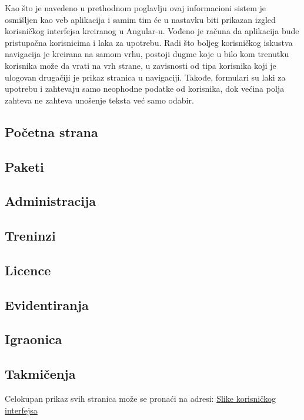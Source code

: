 \documentclass[../main.tex]{subfiles}
\begin{document}
Kao što je navedeno u prethodnom poglavlju ovaj informacioni sistem je osmišljen kao veb aplikacija i samim tim će u nastavku biti prikazan izgled korisničkog interfejsa kreiranog u Angular-u.
Vođeno je računa da aplikacija bude pristupačna korisnicima i laka za upotrebu. Radi što boljeg korisničkog iskustva navigacija je kreirana na samom vrhu, postoji dugme koje u bilo kom trenutku korisnika može da vrati na vrh strane, u zavisnosti od tipa korisnika koji je ulogovan drugačiji je prikaz stranica u navigaciji. Takođe, formulari su laki za upotrebu i zahtevaju samo neophodne podatke od korisnika, dok većina polja zahteva ne zahteva unošenje teksta već samo odabir.

\subsection{Početna strana}


\subsection{Paketi}
 

\subsection{Administracija}


\subsection{Treninzi}


\subsection{Licence}


\subsection{Evidentiranja}


\subsection{Igraonica}


\subsection{Takmičenja}


Celokupan prikaz svih stranica može se pronaći na adresi: \href{https://github.com/jovanape/Informacioni-sistem-za-teretane/tree/main/screenshot-ovi_web_aplikacije}{Slike korisničkog interfejsa}
\end{document}
